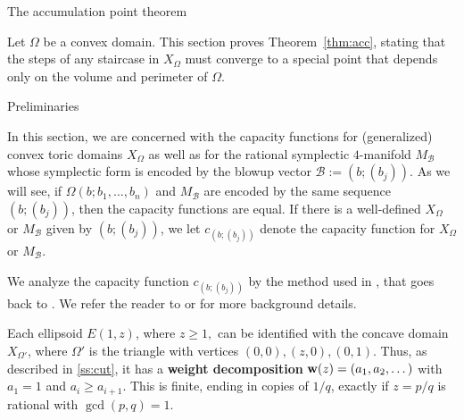 \documentclass[11pt, reqno]{amsart}
\makeatletter
\def\section{\@startsection{section}{1}%
  \z@{.7\linespacing\@plus\linespacing}{.5\linespacing}%
  {\normalfont\Large\bfseries}}
\def\subsection{\@startsection{subsection}{2}%
  \z@{.75\linespacing\@plus.7\linespacing}{-.5em}%
  {\normalfont\large\bfseries}}
\theoremstyle{remark}
\numberwithin{equation}{subsection}
\numberwithin{figure}{section}
\theoremstyle{customremark}
\newcommand{\bw}{{\bf w}}
\newcommand{\Om}{{\Omega}}
\makeatother
\begin{document}
 
\section{The accumulation point theorem}\label{sec:acc}

Let $\Om$ be a convex domain. This section proves Theorem~\ref{thm:acc}, stating that the steps of any staircase in $X_\Om$  must converge 
to a special point that depends only on the volume and perimeter of $\Om$. 



\subsection{Preliminaries}\label{ss:acc1}

In this section, we are concerned with the capacity functions for (generalized) convex toric domains $X_\Omega$ as well as for the rational symplectic $4$-manifold $M_{\mathcal{B}}$ whose symplectic form is encoded by the blowup vector $\mathcal{B}:=(b;(b_j))$. As we will see, if $\Omega(b;b_1,\hdots,b_n)$ and $M_{\mathcal{B}}$ are encoded by the same sequence $(b;(b_j))$, then the capacity functions are equal. If there is a well-defined $X_\Omega$ or $M_{\mathcal{B}}$ given by $(b;(b_j))$, we let $c_{(b;(b_j))}$ denote the capacity function for $X_\Omega$ or $M_{\mathcal{B}}$. 


 
We analyze the capacity function $c_{(b;(b_j))}$ by the method used in \cite{AADT}, that goes back to \cite{Mell,ball}.  We refer the reader to \cite[\S2.3]{AADT} or \cite[\S2]{BHM} for more background details.  


Each ellipsoid $E(1,z)$, where $ z\ge 1,$ can be identified with the concave domain $X_{\Om'}$, where $\Om'$ is the triangle with vertices $(0,0), (z,0), (0,1)$. Thus, as described in \ref{ss:cut}, it has a {\bf weight decomposition} $\bw(z) = (a_1,a_2,\dots)$ with $a_1=1$ and $a_i\ge a_{i+1}$.
This is finite, ending in copies of $1/q$, exactly if $z= p/q$ is rational with $\gcd(p,q)=1$.
\end{document}
